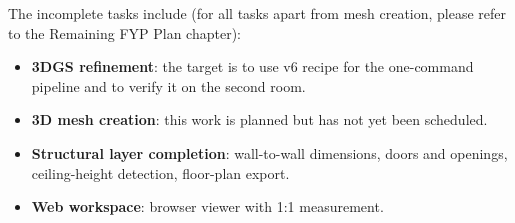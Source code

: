 The incomplete tasks include (for all tasks apart from mesh creation, please refer to the Remaining FYP Plan chapter):
\begin{itemize}
    \item \textbf{3DGS refinement}: the target is to use v6 recipe for the one-command pipeline and to verify it on the second room.
    \item \textbf{3D mesh creation}: this work is planned but has not yet been scheduled.
    \item \textbf{Structural layer completion}: wall-to-wall dimensions, doors and openings, ceiling-height detection, floor-plan export.
    \item \textbf{Web workspace}: browser viewer with 1:1 measurement.
\end{itemize}
